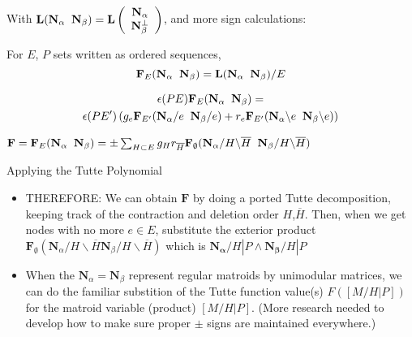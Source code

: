\documentclass{beamer}
\newcommand{\ext}[1]{\ensuremath{\mathbf{#1}}}
\begin{document}
\begin{frame}
\end{frame}




\begin{frame}
  With $\ext{L}(\eNal\;\; \eNbe)=\ext{L}\left(\begin{array}{c}\eNal \\ \eNbePe \end{array} \right)$, and more sign calculations:
    \begin{definition}
      For $E$, $P$ sets written as ordered sequences,
      \[
      \ext{F}_E(\eNal\;\;\eNbe) = \ext{L}(\eNal\;\;\eNbe)/E
      \]
    \end{definition}
    \begin{theorem}
      \begin{multline*}
        \epsilon(PE)\ext{F}_E(\eNal\;\;\eNbe)=\\
        \epsilon(PE')
        \left(g_e\ext{F}_{E'}(\eNal/e\;\; \eNbe/e) +
      r_e\ext{F}_{E'}(\eNal\backslash e\;\; \eNbe\backslash e)\right)
      \end{multline*}
  \end{theorem}

\end{frame}

\begin{frame}
  \begin{corollary}
       $
       \ext{F}=\ext{F}_E(\eNal\;\;\eNbe) =
          \pm\sum_{H\subset E}g_H r_{\overline{H}}
       \ext{F}_\emptyset
       (\ext{N}_\alpha /H \backslash\overline{H} \;\;
        \ext{N}_\beta/H\backslash\overline{H})
        $
  \end{corollary}
  \begin{block}{Applying the Tutte Polynomial}
    \begin{itemize}
      \item
    THEREFORE:  We can obtain $\ext{F}$ by doing a ported Tutte decomposition, keeping track of the
    contraction and deletion order $H$,$\overline{H}$. Then, when we get nodes with no more $e\in E$,
    substitute the exterior product
     $\ext{F}_\emptyset
       (\ext{N}_\alpha /H \backslash\overline{H}
    \ext{N}_\beta/H\backslash\overline{H})$ which is
    $\ext{N_\alpha}/H|P\wedge\ext{N_\beta}/H|P$
  \item When the $\ext{N}_\alpha=\ext{N}_\beta$ represent regular matroids by unimodular matrices, we can do the
    familiar substition of the Tutte function value(s) $F([M/H|P])$ for the matroid variable (product) $[M/H|P]$.
    (More research needed to develop how to make sure proper $\pm$ signs are maintained everywhere.)
    \end{itemize}
  \end{block}
\end{frame}
\end{document}
